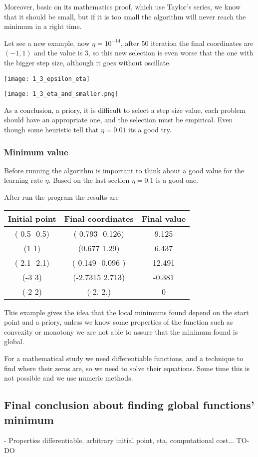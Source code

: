     Moreover, basic on its mathematics proof, which use Taylor's series, we know that it should be small, but if it is too small the algorithm will never reach the minimum in a right time.

 Let see a new example, now $\eta = 10^{-14}$, after 50 iteration  the final coordinates are $(-1, 1)$  and the value is $3$, so this new selection is even worse that the one with the bigger step size, although it goes without oscillate.  

 \texttt{[image: 1\_3\_epsilon\_eta]}
 
 \texttt{[image: 1\_3\_eta\_and\_smaller.png]}
 
  As a conclusion, a priory, it is difficult to select a step size value, each problem should have an appropriate one, and the selection must be empirical. Even though some heuristic \cite{LFD} tell that $\eta = 0.01$ its a good try.  

 
  

\subsubsection{Minimum value }


Before running the algorithm is important to think about a good value for the learning rate $\eta$. Based on the last section $\eta = 0.1$ is a good one. 


After run the program the  results are

\begin{center}
  \begin{tabular}{ |c|c|c| }
    \hline
    Initial point  & Final coordinates & Final value  \\ 
    \hline

    (-0.5 -0.5) &  (-0.793 -0.126) &   9.125 \\
(1 1) &  (0.677 1.29) &   6.437 \\
( 2.1 -2.1) &  ( 0.149 -0.096 ) &   12.491 \\
(-3  3) &  (-2.7315  2.713) &  -0.381 \\
(-2  2) &  (-2.  2.) &  0 \\
    
 
 \hline
\end{tabular}
\end{center}


This example gives the idea that the local minimums found depend on the start point and a priory, unless we know some properties
of the function such as convexity or monotony we are not able to assure that the minimum found is global.

For a mathematical study we need differentiable functions, and a technique to  find where their zeros are, so we need to solve their equations. Some time
this is not possible and we use numeric methods.




\subsection{ Final conclusion about finding global functions' minimum}  


- Properties differentiable, arbitrary initial point, eta, computational cost...  TO-DO


